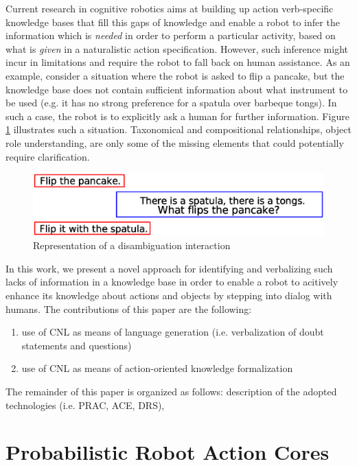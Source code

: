 \documentclass[oribibl]{llncs}
\begin{document}
Current research in cognitive robotics aims at building up action 
verb-specific knowledge bases that fill this gaps of knowledge and 
enable a robot to infer the information which is \textit{needed} in 
order to perform a particular activity, based on what is \textit 
{given} in a naturalistic action specification. However, such 
inference might incur in limitations and require the robot to fall 
back on human assistance. As an example, consider a situation where 
the robot is asked to flip a pancake, but the knowledge base does 
not contain sufficient information about what instrument to be used 
(e.g. it has no strong preference for a spatula over barbeque 
tongs). In such a case, the robot is to explicitly ask a human for 
further information. Figure \ref{fig:application} illustrates such a 
situation. Taxonomical and compositional relationships, object role 
understanding, are only some of the missing elements that could 
potentially require clarification. 


\begin{figure}[H]
\includegraphics[scale=0.51, trim = 0mm 0mm 0mm 8mm]{introduction.eps}
\caption{Representation of a disambiguation interaction}
\label{fig:application}
\end{figure} 

In this work, we present a novel approach for identifying and 
verbalizing such lacks of information in a knowledge base in order to enable
a robot to acitively enhance its knowledge about actions and objects
by stepping into dialog with humans. 
\newpage
The contributions of this paper
are the following:
\begin{enumerate}
    \item use of CNL as means of language generation (i.e. verbalization of doubt statements and questions)
    \item use of CNL as means of action-oriented knowledge formalization
\end{enumerate}
The remainder of this paper is organized as follows: description of the adopted technologies (i.e. PRAC, ACE, DRS), 

\section{Probabilistic Robot Action Cores}
\end{document}
